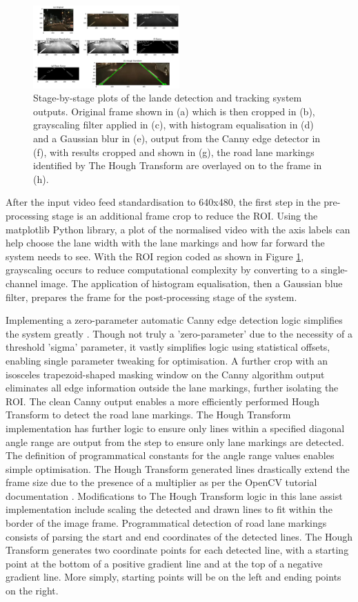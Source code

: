 \documentclass[9pt,conference]{IEEEtran}
\begin{document}
\begin{figure}[htbp]
    \centerline{\includegraphics[width=0.5\textwidth]{assets/LDS_plot.png}}
    \caption{Stage-by-stage plots of the lande detection and tracking system outputs. Original frame shown in (a) which is then cropped in (b), grayscaling filter applied in (c), with histogram equalisation in (d) and a Gaussian blur in (e), output from the Canny edge detector in (f), with results cropped and shown in (g), the road lane markings identified by The Hough Transform are overlayed on to the frame in (h).}
    \label{f2}
\end{figure}

After the input video feed standardisation to 640x480, the first step in the pre-processing stage is an additional frame crop to reduce the ROI. Using the matplotlib Python library, a plot of the normalised video with the axis labels can help choose the lane width with the lane markings and how far forward the system needs to see. With the ROI region coded as shown in Figure \ref{f2}, grayscaling occurs to reduce computational complexity by converting to a single-channel image. The application of histogram equalisation, then a Gaussian blue filter, prepares the frame for the post-processing stage of the system.

Implementing a zero-parameter automatic Canny edge detection logic simplifies the system greatly \cite{b9}. Though not truly a 'zero-parameter' due to the necessity of a threshold 'sigma' parameter, it vastly simplifies logic using statistical offsets, enabling single parameter tweaking for optimisation. A further crop with an isosceles trapezoid-shaped masking window on the Canny algorithm output eliminates all edge information outside the lane markings, further isolating the ROI. The clean Canny output enables a more efficiently performed Hough Transform to detect the road lane markings. The Hough Transform implementation has further logic to ensure only lines within a specified diagonal angle range are output from the step to ensure only lane markings are detected. The definition of programmatical constants for the angle range values enables simple optimisation. The Hough Transform generated lines drastically extend the frame size due to the presence of a multiplier as per the OpenCV tutorial documentation \cite{b10}. Modifications to The Hough Transform logic in this lane assist implementation include scaling the detected and drawn lines to fit within the border of the image frame. Programmatical detection of road lane markings consists of parsing the start and end coordinates of the detected lines. The Hough Transform generates two coordinate points for each detected line, with a starting point at the bottom of a positive gradient line and at the top of a negative gradient line. More simply, starting points will be on the left and ending points on the right.
\end{document}
